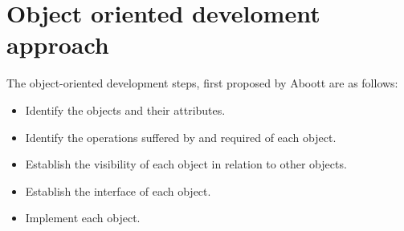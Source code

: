 \section{Object oriented develoment approach}

The object-oriented development steps, 
first proposed by Aboott \cite{Abbott:1980} are as follows:

\begin{itemize}
  \item Identify the objects and their attributes.
  \item Identify the operations suffered by and required
		of each object.
  \item Establish the visibility of each object in 
		relation to other objects.
  \item Establish the interface of each object.
  \item Implement each object.  
\end{itemize}

